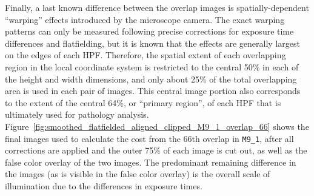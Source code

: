 \documentclass[letterpaper,11pt]{article}
\newcommand{\reffig}[1]{Figure~\ref{#1}}
\begin{document}
Finally, a last known difference between the overlap images is spatially-dependent ``warping'' effects introduced by the microscope camera. The exact warping patterns can only be measured following precise corrections for exposure time differences and flatfielding, but it is known that the effects are generally largest on the edges of each HPF. Therefore, the spatial extent of each overlapping region in the local coordinate system is restricted to the central 50\% in each of the height and width dimensions, and only about 25\% of the total overlapping area is used in each pair of images. This central image portion also corresponds to the extent of the central 64\%, or ``primary region'', of each HPF that is ultimately used for pathology analysis. \reffig{fig:smoothed_flatfielded_aligned_clipped_M9_1_overlap_66} shows the final images used to calculate the cost from the 66th overlap in \texttt{M9\_1}, after all corrections are applied and the outer 75\% of each image is cut out, as well as the false color overlay of the two images. The predominant remaining difference in the images (as is visible in the false color overlay) is the overall scale of illumination due to the differences in exposure times. 
\end{document}
